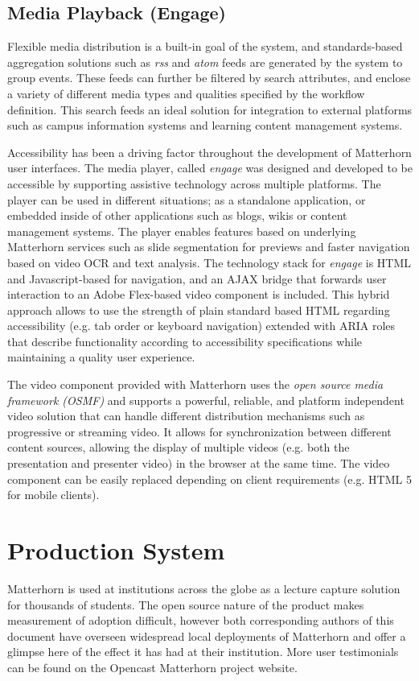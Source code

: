 \documentclass{sig-alternate}
\begin{document}
\subsection{Media Playback (Engage)}
Flexible media distribution is a built-in goal of the system, and standards-based aggregation solutions such as \emph{rss} and \emph{atom} feeds are generated by the system to group events. These feeds can further be filtered by search attributes, and enclose a variety of different media types and qualities specified by the workflow definition.  This search feeds an ideal solution for integration to external platforms such as campus information systems and learning content management systems.

Accessibility has been a driving factor throughout the development of Matterhorn user interfaces. The media player, called \emph{engage} was designed and developed to be accessible by supporting assistive technology across multiple platforms. The player can be used in different situations; as a standalone application, or embedded inside of other applications such as blogs, wikis or content management systems. The player enables features based on underlying Matterhorn services such as slide segmentation for previews and faster navigation based on video OCR and text analysis. The technology stack for \emph{engage} is HTML and Javascript-based for navigation, and an AJAX bridge that forwards user interaction to an Adobe Flex-based video component is included.  This hybrid approach allows to use the strength of plain standard based HTML regarding accessibility (e.g. tab order or keyboard navigation) extended with ARIA roles that describe functionality according to accessibility specifications while maintaining a quality user experience. 

The video component provided with Matterhorn uses the \emph{open source media framework (OSMF)} and supports a powerful, reliable, and platform independent video solution that can handle different distribution mechanisms such as progressive or streaming video.  It allows for synchronization between different content sources, allowing the display of multiple videos (e.g. both the presentation and presenter video) in the browser at the same time.  The video component can be easily replaced depending on client requirements (e.g. HTML 5 for mobile clients).

\section{Production System}
Matterhorn is used at institutions across the globe as a lecture capture solution for thousands of students.  The open source nature of the product makes measurement of adoption difficult, however both corresponding authors of this document have overseen widespread local deployments of Matterhorn and offer a glimpse here of the effect it has had at their institution.  More user testimonials can be found on the Opencast Matterhorn project website.
\end{document}
